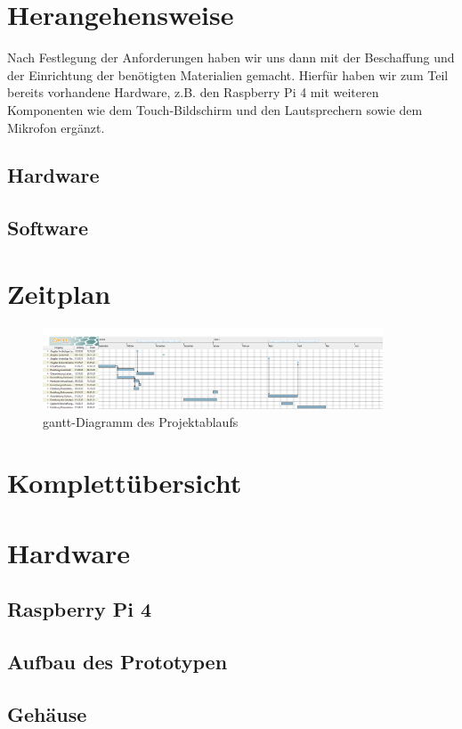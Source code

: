 \documentclass[12pt,a4paper]{article}
\begin{document}
	\section{Herangehensweise}
	Nach Festlegung der Anforderungen haben wir uns dann mit der Beschaffung und der Einrichtung der benötigten Materialien gemacht. Hierfür haben wir zum Teil bereits vorhandene Hardware, z.B. den Raspberry Pi 4 mit weiteren Komponenten wie dem Touch-Bildschirm und den Lautsprechern sowie dem Mikrofon ergänzt.
	\subsection{Hardware}
	\subsection{Software}
	\section{Zeitplan}
		\begin{figure}[htb]
			\includegraphics[width=0.9\textwidth]{TAR_FKMS_20202021.png}
			\caption[gantt-Diagramm des Projektablaufs]{gantt-Diagramm des Projektablaufs}
 			\label{fig:gantt-diagramm}
 		\end{figure}
	\section{Komplettübersicht}
	\section{Hardware}
	\subsection{Raspberry Pi 4}
	\subsection{Aufbau des Prototypen}
	\subsection{Gehäuse}
\end{document}
